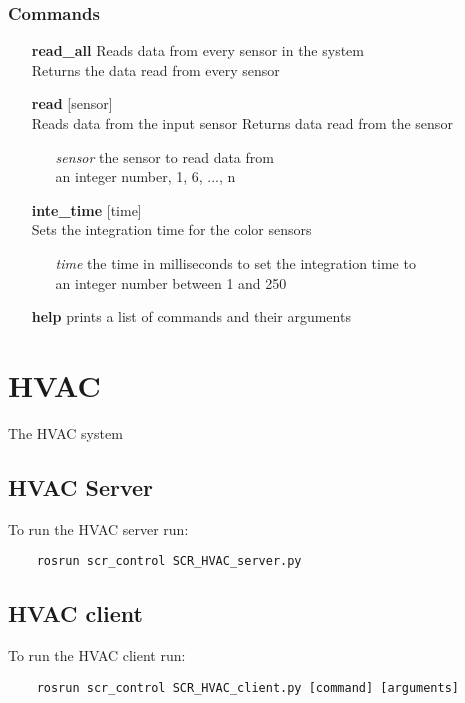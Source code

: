 \documentclass[twoside]{article}
\begin{document}
	\subsubsection{Commands}
	
	\begin{enumerate}
		\item[\bf read\_all] Reads data from every sensor in the system\\
		Returns the data read from every sensor
		\item[\bf read] [sensor]\\
		Reads data from the input sensor
		Returns data read from the sensor
	
		\begin{enumerate}[leftmargin=3\parindent]
			\item[\it sensor] the sensor to read data from\\
			an integer number, 1, 6, ..., n
		\end{enumerate}
	
	\item[\bf inte\_time] [time]\\
	Sets the integration time for the color sensors
	
	\begin{enumerate}[leftmargin=3\parindent]
		\item[\it time] the time in milliseconds to set the integration time to\\
		an integer number between 1 and 250
	\end{enumerate}
	
		\item[\bf help] prints a list of commands and their arguments
	\end{enumerate}
	
	\section{HVAC}
	The HVAC system 
	
	\subsection{HVAC Server}
	To run the HVAC server run:
	\begin{verbatim}
	rosrun scr_control SCR_HVAC_server.py
	\end{verbatim}
	
	\subsection{HVAC client}
	To run the HVAC client run:
	\begin{verbatim}
	rosrun scr_control SCR_HVAC_client.py [command] [arguments]
	\end{verbatim}
	
\end{document}
